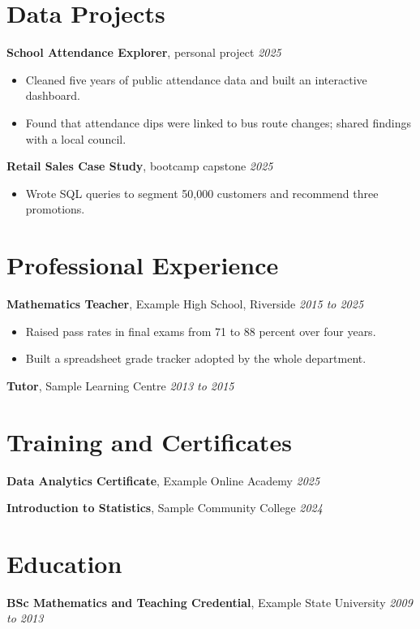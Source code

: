 \documentclass[11pt]{article}
\newcommand{\experience}[3]{\textbf{#1}, #2 \hfill \textit{#3}\par}
\begin{document}
\section{Data Projects}
\experience{School Attendance Explorer}{personal project}{2025}
\begin{itemize}
  \item Cleaned five years of public attendance data and built an interactive dashboard.
  \item Found that attendance dips were linked to bus route changes; shared findings with a local council.
\end{itemize}
\experience{Retail Sales Case Study}{bootcamp capstone}{2025}
\begin{itemize}
  \item Wrote SQL queries to segment 50,000 customers and recommend three promotions.
\end{itemize}

\section{Professional Experience}
\experience{Mathematics Teacher}{Example High School, Riverside}{2015 to 2025}
\begin{itemize}
  \item Raised pass rates in final exams from 71 to 88 percent over four years.
  \item Built a spreadsheet grade tracker adopted by the whole department.
\end{itemize}
\experience{Tutor}{Sample Learning Centre}{2013 to 2015}

\section{Training and Certificates}
\experience{Data Analytics Certificate}{Example Online Academy}{2025}
\experience{Introduction to Statistics}{Sample Community College}{2024}

\section{Education}
\experience{BSc Mathematics and Teaching Credential}{Example State University}{2009 to 2013}
\end{document}
